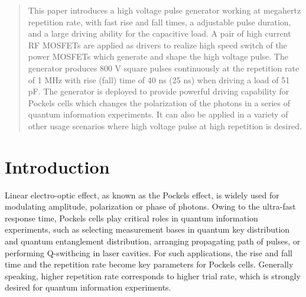 \documentclass[aip,rsi,reprint,graphicx]{revtex4-1} %
\begin{document}
\begin{abstract}
  This paper introduces a high voltage pulse generator working at megahertz repetition rate,  with fast rise and fall times, a adjustable pulse duration, and a large driving ability for the capacitive load. 
 A pair of high current RF MOSFETs are applied as drivers to realize high speed switch of the power MOSFETs which generate and shape the high voltage pulse. The generator produces 800 V square pulses continuously at the repetition rate of 1 MHz with rise (fall) time of 40 ns (25 ns) when driving a load of 51 pF.
 The generator is deployed to provide powerful driving capability for Pockels cells which changes the polarization of the photons in a series of quantum information experiments. It can also be applied in a variety of other usage scenarios where high voltage pulse at high repetition is desired.
\end{abstract}

\pacs{}%

\maketitle %


\section{Introduction}
Linear electro-optic effect, as known as the Pockels effect, is widely used for modulating amplitude, polarization or phase of photons. Owing to the ultra-fast response time, Pockels cells play critical roles in quantum information experiments,
 such as selecting measurement bases in quantum key distribution and quantum entanglement distribution\cite{yin2017satellite,giustina2015significant,shalm2015strong},
 arranging propagating path of pulses\cite{li2016experimental,wang2017high},
 or performing Q-swithcing in laser cavities\cite{kwiat1995interaction}.
 For such applications, the rise and fall time and the repetition rate become key parameters for Pockels cells.
 Generally speaking, higher repetition rate corresponds to higher trial rate, which is strongly desired for quantum information experiments. 
\end{document}
